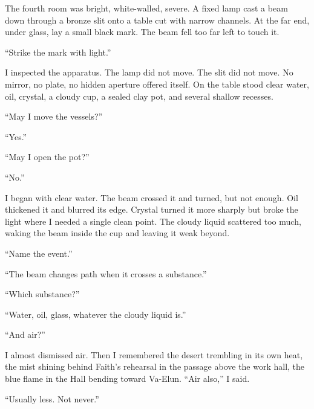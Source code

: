 \ornament

The fourth room was bright, white-walled, severe. A fixed lamp cast a beam down through a bronze slit onto a table cut with narrow channels. At the far end, under glass, lay a small black mark. The beam fell too far left to touch it.\par

``Strike the mark with light.''\par

I inspected the apparatus. The lamp did not move. The slit did not move. No mirror, no plate, no hidden aperture offered itself. On the table stood clear water, oil, crystal, a cloudy cup, a sealed clay pot, and several shallow recesses.\par

``May I move the vessels?''\par

``Yes.''\par

``May I open the pot?''\par

``No.''\par

I began with clear water. The beam crossed it and turned, but not enough. Oil thickened it and blurred its edge. Crystal turned it more sharply but broke the light where I needed a single clean point. The cloudy liquid scattered too much, waking the beam inside the cup and leaving it weak beyond.\par

``Name the event.''\par

``The beam changes path when it crosses a substance.''\par

``Which substance?''\par

``Water, oil, glass, whatever the cloudy liquid is.''\par

``And air?''\par

I almost dismissed air. Then I remembered the desert trembling in its own heat, the mist shining behind Faith's rehearsal in the passage above the work hall, the blue flame in the Hall bending toward Va-Elun. ``Air also,'' I said.\par

``Usually less. Not never.''\par

